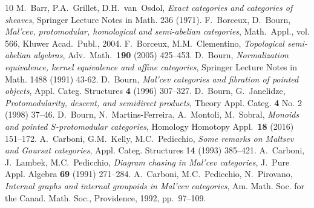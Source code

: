 \documentclass[11pt]{amsart}
\theoremstyle{plain}
\theoremstyle{definition}
\theoremstyle{remark}
\begin{document}
\begin{thebibliography}{10}
 M.~Barr, P.A.~Grillet, D.H.~van~Osdol, \emph{Exact categories and categories of sheaves}, Springer Lecture Notes in Math. 236 (1971).
 F.~Borceux, D.~Bourn, \emph{Mal'cev, protomodular, homological and semi-abelian categories}, Math.~Appl., vol. 566, Kluwer Acad.~Publ., 2004.
 F.~Borceux, M.M.~Clementino, \emph{Topological semi-abelian algebras}, Adv.~Math.~\textbf{190} (2005) 425--453.
 D.~Bourn, \emph{Normalization equivalence, kernel equivalence and affine categories}, Springer Lecture Notes in Math. 1488 (1991) 43-62.
 D.~Bourn, \emph{Mal'cev categories and fibration of pointed objects}, Appl. Categ. Structures \textbf{4} (1996) 307--327.
 D.~Bourn, G.~Janelidze, \emph{Protomodularity, descent, and semidirect products}, Theory Appl. Categ. \textbf{4} No. 2 (1998) 37--46.
 D.~Bourn, N.~Martins-Ferreira, A.~Montoli, M.~Sobral, \emph{Monoids and pointed $S$-protomodular
categories}, Homology Homotopy Appl.~\textbf{18} (2016) 151--172.
 A.~Carboni, G.M.~Kelly, M.C.~Pedicchio, \emph{Some remarks on {M}altsev and {G}oursat categories}, Appl. Categ. Structures 1\textbf{4} (1993) 385--421.
 A.~Carboni, J.~Lambek, M.C.~Pedicchio, \emph{Diagram chasing in {M}al'cev categories}, J.~Pure Appl. Algebra \textbf{69} (1991) 271--284.
 A.~Carboni, M.C.~Pedicchio,  N.~Pirovano, \emph{Internal graphs and internal groupoids in {M}al'cev categories}, Am. Math. Soc. for the Canad. Math. Soc., Providence, 1992, pp.~97--109.

\end{thebibliography}
\end{document}
